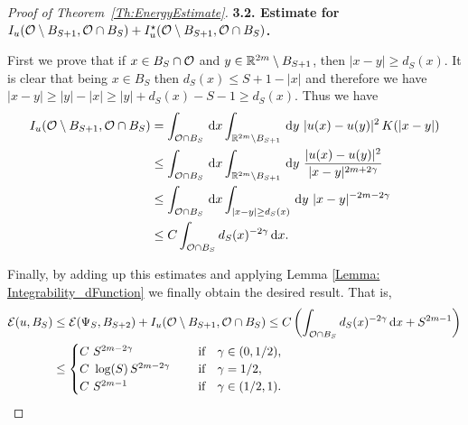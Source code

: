 \begin{proof}[Proof of Theorem~\ref{Th:EnergyEstimate}]

\textbf{3.2. Estimate for $I_u(\mathcal{O} \setminus B_{S+1}, \mathcal{O} \cap B_S) + I_u^\star(\mathcal{O} \setminus B_{S+1}, \mathcal{O} \cap B_S)$.}


First we prove that if $x\in B_S\cap \mathcal{O}$ and $y\in \mathbb{R}^{2m}\setminus B_{S+1}$, then $|x-y|\geq d_S(x)$. It is clear that being $x\in B_S$ then $d_S(x) \leq S+1-|x|$ and therefore we have $|x-y|\geq |y|-|x|\geq |y|+d_S(x)-S-1 \geq  d_S(x)$. Thus we have
\begin{align*}
I_u(\ocal \setminus B_{S+1}, \ocal \cap B_S) &= \int_{\ocal\cap B_S} \d x \int_{\R^{2m}\setminus B_{S+1}} \d y \ |u(x)-u(y)|^2 \, K(|x-y|) \\
&\leq \int_{\ocal\cap B_S} \d x \int_{\R^{2m}\setminus B_{S+1}} \d y \ \frac{|u(x)-u(y)|^2}{|x-y|^{2m+2\s}} \\
&\leq \int_{\ocal\cap B_S} \d x \int_{|x-y|\geq d_S(x)} \d y \ |x-y|^{-2m-2\s} \\
&\leq C \int_{\ocal \cap B_{S}} d_S(x)^{-2\s} \d x.
\end{align*}

Finally, by adding up this estimates and applying Lemma \ref{Lemma: Integrability_dFunction} we finally obtain the desired result. That is,
\begin{align*}
\mathcal{E}(u,B_S) &\leq \mathcal{E}(\Psi_S,B_{S+2}) + I_u(\mathcal{O} \setminus B_{S+1}, \mathcal{O} \cap B_S) \leq C\left(\int_{\mathcal{O} \cap B_{S}} d_S(x)^{-2\gamma} \,\mathrm{d} x + S^{2m-1} \right)\\
&\leq \begin{cases}
C \ S^{2m-2\gamma}\ \ \ &\textrm{if } \ \ \gamma\in(0,1/2),\\
C\ \log(S)\,S^{2m-2\gamma}\ \ \ \ &\textrm{if } \ \ \gamma=1/2,\\
C \ S^{2m-1}\ \ \ \ &\textrm{if } \ \ \gamma\in(1/2,1).\\
\end{cases}
\end{align*}
\end{proof}
